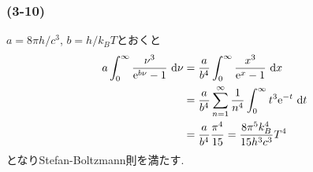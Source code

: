 \subsubsection*{(3-10)}
$a=8\pi h/c^3$, $b=h/k_BT$とおくと
\begin{align}
  \begin{split}
    a\int^\infty_0\frac{\nu^3}{{\rm e}^{b\nu}-1}\ {\rm d}\nu&=\frac{a}{b^4}\int^\infty_0\frac{x^3}{{\rm e}^x-1}\ {\rm d}x\\
    &=\frac{a}{b^4}\sum_{n=1}^\infty\frac{1}{n^4}\int_0^\infty t^3{\rm e}^{-t}\ {\rm d}t\\
    &=\frac{a}{b^4}\frac{\pi^4}{15}=\frac{8\pi^5k_B^4}{15h^3c^3}T^4
  \end{split}
\end{align}
となりStefan-Boltzmann則を満たす.